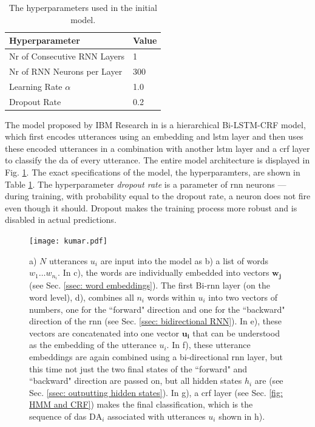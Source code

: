     \begin{table}[h]
    \centering
        \begin{tabular}{|l|l|}
        \hline
        \textbf{Hyperparameter}      & \textbf{Value} \\ \hline
        Nr of Consecutive RNN Layers & 1              \\ \hline
        Nr of RNN Neurons per Layer  & 300            \\ \hline
        Learning Rate $\alpha$       & 1.0            \\ \hline
        Dropout Rate                 & 0.2            \\ \hline
        \end{tabular}
        \caption{\label{table: da hyperparams} The hyperparameters used in the initial model. }
    \end{table}
    The \gls{model} proposed by IBM Research in \cite{kumar2017dialogue} is a hierarchical Bi-LSTM-CRF \gls{model}, which first encodes \glspl{utterance} using an \gls{embedding} and \gls{lstm} layer and then uses these encoded \glspl{utterance} in a combination with another \gls{lstm} layer and a \gls{crf} layer to classify the \gls{da} of every \gls{utterance}. The entire \gls{model} architecture is displayed in Fig. \ref{fig:kumar_model}. The exact specifications of the model, the hyperparamters, are shown in Table \ref{table: da hyperparams}. The hyperparameter \textit{dropout rate} is a parameter of \gls{rnn} \glspl{neuron} --- during training, with probability equal to the dropout rate, a \gls{neuron} does not fire even though it should. Dropout makes the training process more robust and is disabled in actual predictions\cite{mlTextbook}.

    \begin{figure}[h]
        \centering
        \texttt{[image: kumar.pdf]}
        \caption{a) $N$ \glspl{utterance} $u_i$ are input into the \gls{model} as b) a list of words $w_1 \dots w_{n_i}$. In c), the words are individually embedded into vectors $\mathbf{w_j}$ (see Sec. \ref{ssec: word embeddings}). The first Bi-\gls{rnn} layer (on the word level), d), combines all $n_i$ words within $u_i$ into two vectors of numbers, one for the ``forward" direction and one for the ``backward" direction of the \gls{rnn} (see Sec. \ref{ssec: bidirectional RNN}). In e), these vectors are concatenated into one vector $\mathbf{u_i}$ that can be understood as the \gls{embedding} of the \gls{utterance} $u_i$. In f), these \gls{utterance} \glspl{embedding} are again combined using a bi-directional \gls{rnn} layer, but this time not just the two final states of the ``forward" and ``backward" direction are passed on, but all hidden states $h_i$ are (see Sec. \ref{ssec: outputting hidden states}). In g), a \gls{crf} layer (see Sec. \ref{fig: HMM and CRF}) makes the final classification, which is the sequence of \glspl{da} $\text{DA}_i$ associated with \glspl{utterance} $u_i$ shown in h).}
        \label{fig:kumar_model}
    \end{figure}

